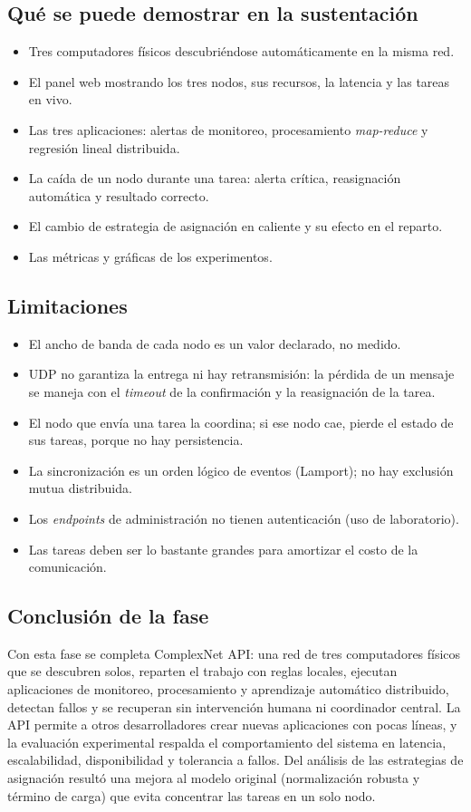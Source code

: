 \documentclass{article}
\begin{document}
\subsection{Qué se puede demostrar en la sustentación}

\begin{itemize}
\item Tres computadores físicos descubriéndose automáticamente en la misma red.
\item El panel web mostrando los tres nodos, sus recursos, la latencia y las tareas en vivo.
\item Las tres aplicaciones: alertas de monitoreo, procesamiento \emph{map-reduce} y regresión
lineal distribuida.
\item La caída de un nodo durante una tarea: alerta crítica, reasignación automática y resultado
correcto.
\item El cambio de estrategia de asignación en caliente y su efecto en el reparto.
\item Las métricas y gráficas de los experimentos.
\end{itemize}

\subsection{Limitaciones}

\begin{itemize}
\item El ancho de banda de cada nodo es un valor declarado, no medido.
\item UDP no garantiza la entrega ni hay retransmisión: la pérdida de un mensaje se maneja con el
\emph{timeout} de la confirmación y la reasignación de la tarea.
\item El nodo que envía una tarea la coordina; si ese nodo cae, pierde el estado de sus tareas, porque
no hay persistencia.
\item La sincronización es un orden lógico de eventos (Lamport); no hay exclusión mutua distribuida.
\item Los \emph{endpoints} de administración no tienen autenticación (uso de laboratorio).
\item Las tareas deben ser lo bastante grandes para amortizar el costo de la comunicación.
\end{itemize}

\subsection{Conclusión de la fase}

Con esta fase se completa ComplexNet API: una red de tres computadores físicos que se descubren solos,
reparten el trabajo con reglas locales, ejecutan aplicaciones de monitoreo, procesamiento y
aprendizaje automático distribuido, detectan fallos y se recuperan sin intervención humana ni
coordinador central. La API permite a otros desarrolladores crear nuevas aplicaciones con pocas líneas,
y la evaluación experimental respalda el comportamiento del sistema en latencia, escalabilidad,
disponibilidad y tolerancia a fallos. Del análisis de las estrategias de asignación resultó una mejora
al modelo original (normalización robusta y término de carga) que evita concentrar las tareas en un
solo nodo.
\end{document}
